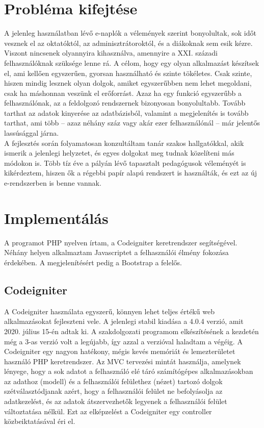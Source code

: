 \documentclass[
]{thesis-ekf}
\begin{document}
\chapter{Probléma kifejtése}
A jelenleg használatban lévő e-naplók a vélemények szerint bonyolultak, sok időt vesznek el az oktatóktól, az adminisztrátoroktól, és a diákoknak sem esik kézre. Viszont nincsenek olyannyira kihasználva, amennyire a XXI. századi felhasználóknak szüksége lenne rá. A célom, hogy egy olyan alkalmazást készítsek el, ami kellően egyszerűen, gyorsan használható és szinte tökéletes. Csak szinte, hiszen mindig lesznek olyan dolgok, amiket egyszerűbben nem lehet megoldani, csak ha máshonnan veszünk el erőforrást. Azaz ha egy funkció egyszerűbb a felhasználónak, az a feldolgozó rendszernek bizonyosan bonyolultabb. Tovább tarthat az adatok kinyerése az adatbázisból, valamint a megjelenítés is tovább tarthat, ami több -- azaz néhány száz vagy akár ezer felhasználónál -- már jelentős lassúsággal járna.\\
A fejlesztés során folyamatosan konzultáltam tanár szakos hallgatókkal, akik ismerik a jelenlegi helyzetet, és egyes dolgokat meg tudnak közelíteni más módokon is. Több tíz éve a pályán lévő tapasztalt pedagógusok véleményét is kikérdeztem, hiszen ők a régebbi papír alapú rendszert is használták, és ezt az új e-rendszerben is benne vannak.
\chapter{Implementálás}
A programot PHP nyelven írtam, a Codeigniter keretrendszer segítségével. Néhány helyen alkalmaztam Javascriptet a felhasználói élmény fokozása érdekében. A megjelenítésért pedig a Bootstrap a felelős.
\section{Codeigniter}
A Codeigniter használata egyszerű, könnyen lehet teljes értékű web alkalmazásokat fejleszteni vele. A jelenlegi stabil kiadása a 4.0.4 verzió, amit 2020. július 15-én adtak ki. A szakdolgozati programom elkészítésének a kezdetén még a 3-as verzió volt a legújabb, így azzal a verzióval haladtam a végéig.
A Codeigniter egy nagyon hatékony, mégis kevés memóriát és lemezterületet használó PHP keretrendszer. Az MVC tervezési mintát használja, amelynek lényege, hogy a sok adatot a felhasználó elé táró számítógépes alkalmazásokban az adathoz (modell) és a felhasználói felülethez (nézet) tartozó dolgok szétválasztódjanak azért, hogy a felhasználói felület ne befolyásolja az adatkezelést, és az adatok átszervezhetők legyenek a felhasználói felület változtatása nélkül. Ezt az elképzelést a Codeigniter egy controller közbeiktatásával éri el.
\end{document}
